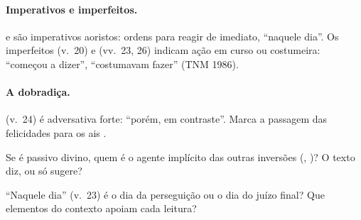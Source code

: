 \paragraph{Imperativos e imperfeitos.}  e  são
imperativos aoristos: ordens para reagir de imediato, \enquote{naquele dia}.
Os imperfeitos  (v.~20) e  (vv.~23, 26) indicam ação
em curso ou costumeira: \enquote{começou a dizer}, \enquote{costumavam fazer}
(TNM 1986).

\paragraph{A dobradiça.}  (v.~24) é adversativa forte:
\enquote{porém, em contraste}. Marca a passagem das felicidades para os ais
\parencite[cf.][]{runge2010}.

\begin{pergunta}
Se  é passivo divino, quem é o agente implícito das outras
inversões (, )? O texto diz, ou só sugere?
\end{pergunta}

\begin{pergunta}
\enquote{Naquele dia} (v.~23) é o dia da perseguição ou o dia do juízo
final? Que elementos do contexto apoiam cada leitura?
\end{pergunta}
